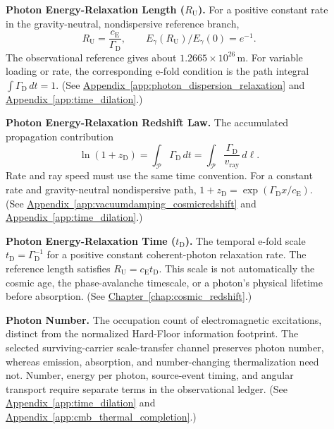 \begin{description}
\item[] \begin{minipage}[t]{\linewidth}
\textbf{Photon Energy-Relaxation Length ($R_{\mathrm U}$).} For a positive constant rate in the gravity-neutral, nondispersive reference branch,
\[
 R_{\mathrm U}=\frac{c_{\mathrm E}}{\Gamma_{\mathrm D}},
 \qquad
 E_\gamma(R_{\mathrm U})/E_\gamma(0)=e^{-1}.
\]
The observational reference gives about $1.2665\times10^{26}\,\mathrm m$. For variable loading or rate, the corresponding e-fold condition is the path integral $\int\Gamma_{\mathrm D}\,dt=1$.
(See \hyperref[app:photon_dispersion_relaxation]{Appendix~\ref*{app:photon_dispersion_relaxation}} and \hyperref[app:time_dilation]{Appendix~\ref*{app:time_dilation}}.)
\end{minipage}

\item[] \begin{minipage}[t]{\linewidth}
\textbf{Photon Energy-Relaxation Redshift Law.} The accumulated propagation contribution
\[
 \ln(1+z_{\mathrm D})
 =\int_{\mathcal P}\Gamma_{\mathrm D}\,dt
 =\int_{\mathcal P}\frac{\Gamma_{\mathrm D}}{v_{\mathrm{ray}}}\,d\ell.
\]
Rate and ray speed must use the same time convention. For a constant rate and gravity-neutral nondispersive path, $1+z_{\mathrm D}=\exp(\Gamma_{\mathrm D}x/c_{\mathrm E})$.
(See \hyperref[app:vacuumdamping_cosmicredshift]{Appendix~\ref*{app:vacuumdamping_cosmicredshift}} and \hyperref[app:time_dilation]{Appendix~\ref*{app:time_dilation}}.)
\end{minipage}

\item[] \begin{minipage}[t]{\linewidth}
\textbf{Photon Energy-Relaxation Time ($t_{\mathrm D}$).} The temporal e-fold scale $t_{\mathrm D}=\Gamma_{\mathrm D}^{-1}$ for a positive constant coherent-photon relaxation rate. The reference length satisfies $R_{\mathrm U}=c_{\mathrm E}t_{\mathrm D}$. This scale is not automatically the cosmic age, the phase-avalanche timescale, or a photon's physical lifetime before absorption.
(See \hyperref[chap:cosmic_redshift]{Chapter~\ref*{chap:cosmic_redshift}}.)
\end{minipage}

\item[] \begin{minipage}[t]{\linewidth}
\textbf{Photon Number.} The occupation count of electromagnetic excitations, distinct from the normalized Hard-Floor information footprint. The selected surviving-carrier scale-transfer channel preserves photon number, whereas emission, absorption, and number-changing thermalization need not. Number, energy per photon, source-event timing, and angular transport require separate terms in the observational ledger.
(See \hyperref[app:time_dilation]{Appendix~\ref*{app:time_dilation}} and \hyperref[app:cmb_thermal_completion]{Appendix~\ref*{app:cmb_thermal_completion}}.)
\end{minipage}


\end{description}
